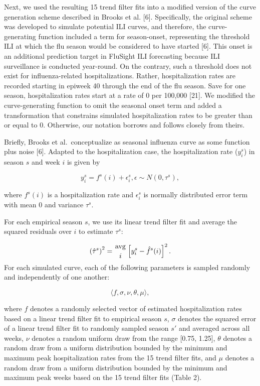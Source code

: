 \documentclass[10pt,letterpaper]{article}
\begin{document}
Next, we used the resulting 15 trend filter fits into a modified version
of the curve generation scheme described in Brooks et al. {[}6{]}.
Specifically, the original scheme was developed to simulate potential
ILI curves, and therefore, the curve-generating function included a term
for season-onset, representing the threshold ILI at which the flu season
would be considered to have started {[}6{]}. This onset is an additional
prediction target in FluSight ILI forecasting because ILI surveillance
is conducted year-round. On the contrary, such a threshold does not
exist for influenza-related hospitalizations. Rather, hospitalization
rates are recorded starting in epiweek 40 through the end of the flu
season. Save for one season, hospitalization rates start at a rate of 0
per 100,000 {[}21{]}. We modified the curve-generating function to omit
the seasonal onset term and added a transformation that constrains
simulated hospitalization rates to be greater than or equal to 0.
Otherwise, our notation borrows and follows closely from theirs.

Briefly, Brooks et al.~conceptualize as seasonal influenza curve as some
function plus noise {[}6{]}. Adapted to the hospitalization case, the
hospitalization rate (\(y^s_i\)) in season \(s\) and week \(i\) is given
by

\[y^s_i = f^s(i) + \epsilon^s_i, \epsilon \sim N(0, \tau^s),\]

where \(f^s(i)\) is a hospitalization rate and \(\epsilon^s_i\) is
normally distributed error term with mean 0 and variance \(\tau^s\).

For each empirical season \(s\), we use its linear trend filter fit and
average the squared residuals over \(i\) to estimate \(\tau^s\):

\[\left( \hat{\tau}^s \right)^2 = \genfrac{}{}{0pt}{}{\text{avg}}{i} \left[ y^s_i - \hat{f}^s (i) \right]^2.\]
For each simulated curve, each of the following parameters is sampled
randomly and independently of one another:

\[\langle f, \sigma, \nu, \theta, \mu \rangle,\]

where \(f\) denotes a randomly selected vector of estimated
hospitalization rates based on a linear trend filter fit to empirical
season \(s\), \(\sigma\) denotes the squared error of a linear trend
filter fit to randomly sampled season \(s'\) and averaged across all
weeks, \(\nu\) denotes a random uniform draw from the range {[}0.75,
1.25{]}, \(\theta\) denotes a random draw from a uniform distribution
bounded by the minimum and maximum peak hospitalization rates from the
15 trend filter fits, and \(\mu\) denotes a random draw from a uniform
distribution bounded by the minimum and maximum peak weeks based on the
15 trend filter fits (Table 2).
\end{document}
